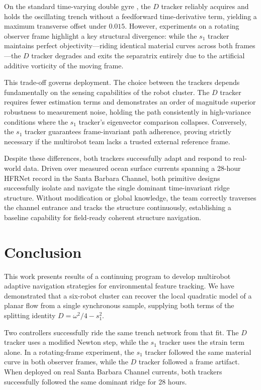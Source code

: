 \documentclass[lettersize,journal]{IEEEtran}
\begin{document}
On the standard time-varying double gyre \cite{17}, the $D$ tracker reliably acquires and holds the oscillating trench without a feedforward time-derivative term, yielding a maximum transverse offset under $0.015$. However, experiments on a rotating observer frame highlight a key structural divergence: while the $s_1$ tracker maintains perfect objectivity—riding identical material curves across both frames—the $D$ tracker degrades and exits the separatrix entirely due to the artificial additive vorticity of the moving frame.

This trade-off governs deployment. The choice between the trackers depends fundamentally on the sensing capabilities of the robot cluster. The $D$ tracker requires fewer estimation terms and demonstrates an order of magnitude superior robustness to measurement noise, holding the path consistently in high-variance conditions where the $s_1$ tracker's eigenvector comparison collapses. Conversely, the $s_1$ tracker guarantees frame-invariant path adherence, proving strictly necessary if the multirobot team lacks a trusted external reference frame.

Despite these differences, both trackers successfully adapt and respond to real-world data. Driven over measured ocean surface currents spanning a 28-hour HFRNet record in the Santa Barbara Channel, both primitive designs successfully isolate and navigate the single dominant time-invariant ridge structure. Without modification or global knowledge, the team correctly traverses the channel entrance and tracks the structure continuously, establishing a baseline capability for field-ready coherent structure navigation.



\section{Conclusion}
\label{sec:conclusion}

This work presents results of a continuing program to develop multirobot adaptive navigation strategies for environmental feature tracking. We have demonstrated that a six-robot cluster can recover the local quadratic model of a planar flow from a single synchronous sample, supplying both terms of the splitting identity $D = \omega^2/4 - s_1^2$.

Two controllers successfully ride the same trench network from that fit. The $D$ tracker uses a modified Newton step, while the $s_1$ tracker uses the strain term alone. In a rotating-frame experiment, the $s_1$ tracker followed the same material curve in both observer frames, while the $D$ tracker followed a frame artifact. When deployed on real Santa Barbara Channel currents, both trackers successfully followed the same dominant ridge for 28 hours. 
\end{document}
